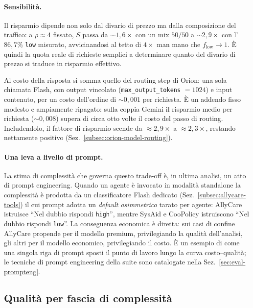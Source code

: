 \paragraph{Sensibilità.} Il risparmio dipende non solo dal divario di
prezzo ma dalla composizione del traffico: a $\rho \approx 4$ fissato, $S$
passa da $\sim 1{,}6\times$ con un mix $50/50$ a $\sim 2{,}9\times$ con
l'$86{,}7\%$ \texttt{low} misurato, avvicinandosi al tetto di $4\times$ man
mano che $f_{\mathrm{low}} \to 1$. È quindi la quota reale di richieste
semplici a determinare quanto del divario di prezzo si traduce in risparmio
effettivo.

Al costo della risposta si somma quello del routing step di Orion: una sola
chiamata Flash, con output vincolato (\texttt{max\_output\_tokens} $= 1024$)
e input contenuto, per un costo dell'ordine di $\sim$\texteuro$0{,}001$ per
richiesta. È un addendo fisso modesto e ampiamente ripagato: sulla coppia
Gemini il risparmio medio per richiesta ($\sim$\texteuro$0{,}008$) supera
di circa otto volte il costo del passo di routing. Includendolo, il fattore
di risparmio scende da $\approx 2{,}9\times$ a $\approx 2{,}3\times$,
restando nettamente positivo (Sez.~\ref{subsec:orion-model-routing}).

\paragraph{Una leva a livello di prompt.} La stima di complessità che
governa questo trade-off è, in ultima analisi, un atto di prompt
engineering. Quando un agente è invocato in modalità standalone la
complessità è prodotta da un classificatore Flash dedicato
(Sez.~\ref{subsec:allycare-tools}) il cui prompt adotta un \emph{default
asimmetrico} tarato per agente: AllyCare istruisce ``Nel dubbio rispondi
\texttt{high}'', mentre SysAid e CooPolicy istruiscono ``Nel dubbio
rispondi \texttt{low}''. La conseguenza economica è diretta: sui casi di
confine AllyCare propende per il modello premium, privilegiando la
qualità dell'analisi, gli altri per il modello economico, privilegiando
il costo. È un esempio di come una singola riga di prompt sposti il punto
di lavoro lungo la curva costo--qualità; le tecniche di prompt
engineering della suite sono catalogate nella
Sez.~\ref{sec:eval-prompteng}.

\subsection{Qualità per fascia di complessità}
\label{subsec:eval-cq-breakdown}

